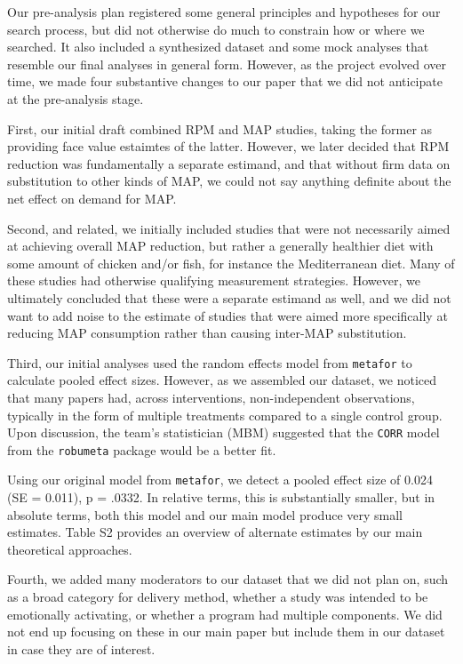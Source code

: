 \documentclass[sn-nature,pdflatex]{sn-jnl}
\begin{document}
Our pre-analysis plan registered some general principles and hypotheses
for our search process, but did not otherwise do much to constrain how
or where we searched. It also included a synthesized dataset and some
mock analyses that resemble our final analyses in general form. However,
as the project evolved over time, we made four substantive changes to
our paper that we did not anticipate at the pre-analysis stage.

First, our initial draft combined RPM and MAP studies, taking the former
as providing face value estaimtes of the latter. However, we later
decided that RPM reduction was fundamentally a separate estimand, and
that without firm data on substitution to other kinds of MAP, we could
not say anything definite about the net effect on demand for MAP.

Second, and related, we initially included studies that were not
necessarily aimed at achieving overall MAP reduction, but rather a
generally healthier diet with some amount of chicken and/or fish, for
instance the Mediterranean diet. Many of these studies had otherwise
qualifying measurement strategies. However, we ultimately concluded that
these were a separate estimand as well, and we did not want to add noise
to the estimate of studies that were aimed more specifically at reducing
MAP consumption rather than causing inter-MAP substitution.

Third, our initial analyses used the random effects model from
\texttt{metafor} to calculate pooled effect sizes. However, as we
assembled our dataset, we noticed that many papers had, across
interventions, non-independent observations, typically in the form of
multiple treatments compared to a single control group. Upon discussion,
the team's statistician (MBM) suggested that the \texttt{CORR} model
from the \texttt{robumeta} package would be a better fit.

Using our original model from \texttt{metafor}, we detect a pooled
effect size of 0.024 (SE = 0.011), p = .0332. In relative terms, this is
substantially smaller, but in absolute terms, both this model and our
main model produce very small estimates. Table S2 provides an overview
of alternate estimates by our main theoretical approaches.

Fourth, we added many moderators to our dataset that we did not plan on,
such as a broad category for delivery method, whether a study was
intended to be emotionally activating, or whether a program had multiple
components. We did not end up focusing on these in our main paper but
include them in our dataset in case they are of interest.
\end{document}
